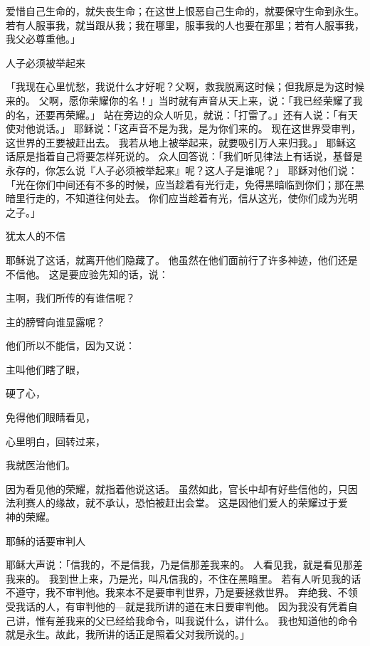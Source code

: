 {爱惜自己生命的，就失丧生命；在这世上恨恶自己生命的，就要保守生命到永生。
若有人服事我，就当跟从我；我在哪里，服事我的人也要在那里；若有人服事我，我父必尊重他。」
\par }{\SH 人子必须被举起来
\par }{\PP {}「我现在心里忧愁，我说什么才好呢？父啊，救我脱离这时候；但我原是为这时候来的。
父啊，愿你荣耀你的名！」当时就有声音从天上来，说：「我已经荣耀了我的名，还要再荣耀。」
站在旁边的众人听见，就说：「打雷了。」还有人说：「有天使对他说话。」
耶稣说：「这声音不是为我，是为你们来的。
现在这世界受审判，这世界的王要被赶出去。
我若从地上被举起来，就要吸引万人来归我。」
耶稣这话原是指着自己将要怎样死说的。
众人回答说：「我们听见律法上有话说，基督是永存的，你怎么说『人子必须被举起来』呢？这人子是谁呢？」
耶稣对他们说：「光在你们中间还有不多的时候，应当趁着有光行走，免得黑暗临到你们；那在黑暗里行走的，不知道往何处去。
你们应当趁着有光，信从这光，使你们成为光明之子。」
\par }{\SH 犹太人的不信
\par }{\PP 耶稣说了这话，就离开他们隐藏了。
他虽然在他们面前行了许多神迹，他们还是不信他。
这是要应验先知{}的话，说：
\par }{\Q 主啊，我们所传的有谁信呢？
\par }{\Q 主的膀臂向谁显露呢？
\par }{\MM {}他们所以不能信，因为{}又说：
\par }{\Q {}主叫他们瞎了眼，
\par }{\Q 硬了心，
\par }{\Q 免得他们眼睛看见，
\par }{\Q 心里明白，回转过来，
\par }{\Q 我就医治他们。
\par }{\PP {}因为看见他的荣耀，就指着他说这话。
虽然如此，官长中却有好些信他的，只因法利赛人的缘故，就不承认，恐怕被赶出会堂。
这是因他们爱人的荣耀过于爱　神的荣耀。
\par }{\SH 耶稣的话要审判人
\par }{\PP {}耶稣大声说：「信我的，不是信我，乃是信那差我来的。
人看见我，就是看见那差我来的。
我到世上来，乃是光，叫凡信我的，不住在黑暗里。
若有人听见我的话不遵守，我不审判他。我来本不是要审判世界，乃是要拯救世界。
弃绝我、不领受我话的人，有审判他的—就是我所讲的道在末日要审判他。
因为我没有凭着自己讲，惟有差我来的父已经给我命令，叫我说什么，讲什么。
我也知道他的命令就是永生。故此，我所讲的话正是照着父对我所说的。」

}
